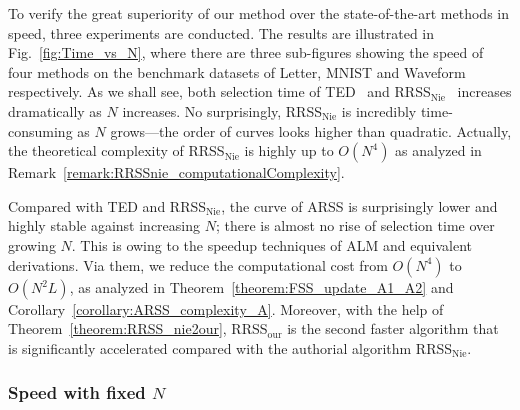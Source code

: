 \documentclass[a4paper]{article}
\begin{document}
To verify the great superiority of our method over the state-of-the-art
methods in speed, three experiments are conducted. The results are
illustrated in Fig.\ \ref{fig:Time_vs_N}, where there are three
sub-figures showing the speed of four methods on the benchmark datasets
of\emph{ }Letter, MNIST and Waveform respectively. As we shall see,
both selection time of TED\ \cite{kaiYu_2006_ICML_activeLearning}
and RRSS$_{\text{Nie}}$\ \cite{FpNie_2013_IJCAI_EarlyActiveLearning}
increases dramatically as $N$ increases. No surprisingly, RRSS$_{\text{Nie}}$
is incredibly time-consuming as $N$ grows---the order of curves looks
higher than quadratic. Actually, the theoretical complexity of RRSS$_{\text{Nie}}$
is highly up to $O\left(N^{4}\right)$ as analyzed in Remark\ \ref{remark:RRSSnie_computationalComplexity}.

Compared with TED and RRSS$_{\text{Nie}}$, the curve of ARSS is surprisingly
lower and highly stable against increasing $N$; there is almost no
rise of selection time over growing $N$. This is owing to the speedup
techniques of ALM and equivalent derivations. Via them, we reduce
the computational cost from $O\left(N^{4}\right)$ to $O\left(N{}^{2}L\right)$,
as analyzed in Theorem\ \ref{theorem:FSS_update_A1_A2} and Corollary\ \ref{corollary:ARSS_complexity_A}.
Moreover, with the help of Theorem\ \ref{theorem:RRSS_nie2our},
RRSS$_{\text{our}}$ is the second faster algorithm that is significantly
accelerated compared with the authorial algorithm RRSS$_{\text{Nie}}$. 


\subsubsection{Speed with\emph{ }fixed $N$}
\end{document}
